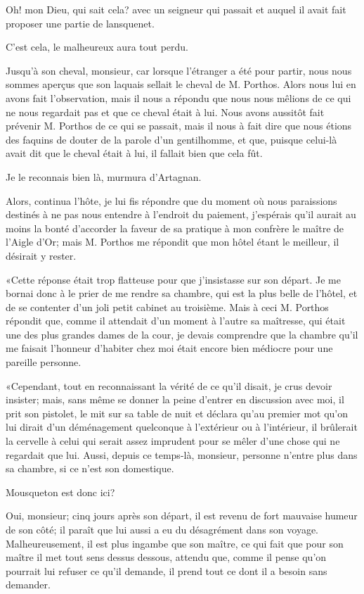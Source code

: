 \speak  Oh! mon Dieu, qui sait cela? avec un seigneur qui passait et auquel il avait fait proposer une partie de lansquenet. 

\speak  C'est cela, le malheureux aura tout perdu. 

\speak  Jusqu'à son cheval, monsieur, car lorsque l'étranger a été pour partir, nous nous sommes aperçus que son laquais sellait le cheval de M. Porthos. Alors nous lui en avons fait l'observation, mais il nous a répondu que nous nous mêlions de ce qui ne nous regardait pas et que ce cheval était à lui. Nous avons aussitôt fait prévenir M. Porthos de ce qui se passait, mais il nous à fait dire que nous étions des faquins de douter de la parole d'un gentilhomme, et que, puisque celui-là avait dit que le cheval était à lui, il fallait bien que cela fût. 

\speak  Je le reconnais bien là, murmura d'Artagnan. 

\speak  Alors, continua l'hôte, je lui fis répondre que du moment où nous paraissions destinés à ne pas nous entendre à l'endroit du paiement, j'espérais qu'il aurait au moins la bonté d'accorder la faveur de sa pratique à mon confrère le maître de l'Aigle d'Or; mais M. Porthos me répondit que mon hôtel étant le meilleur, il désirait y rester. 

«Cette réponse était trop flatteuse pour que j'insistasse sur son départ. Je me bornai donc à le prier de me rendre sa chambre, qui est la plus belle de l'hôtel, et de se contenter d'un joli petit cabinet au troisième. Mais à ceci M. Porthos répondit que, comme il attendait d'un moment à l'autre sa maîtresse, qui était une des plus grandes dames de la cour, je devais comprendre que la chambre qu'il me faisait l'honneur d'habiter chez moi était encore bien médiocre pour une pareille personne. 

«Cependant, tout en reconnaissant la vérité de ce qu'il disait, je crus devoir insister; mais, sans même se donner la peine d'entrer en discussion avec moi, il prit son pistolet, le mit sur sa table de nuit et déclara qu'au premier mot qu'on lui dirait d'un déménagement quelconque à l'extérieur ou à l'intérieur, il brûlerait la cervelle à celui qui serait assez imprudent pour se mêler d'une chose qui ne regardait que lui. Aussi, depuis ce temps-là, monsieur, personne n'entre plus dans sa chambre, si ce n'est son domestique. 

\speak  Mousqueton est donc ici? 

\speak  Oui, monsieur; cinq jours après son départ, il est revenu de fort mauvaise humeur de son côté; il paraît que lui aussi a eu du désagrément dans son voyage. Malheureusement, il est plus ingambe que son maître, ce qui fait que pour son maître il met tout sens dessus dessous, attendu que, comme il pense qu'on pourrait lui refuser ce qu'il demande, il prend tout ce dont il a besoin sans demander. 

